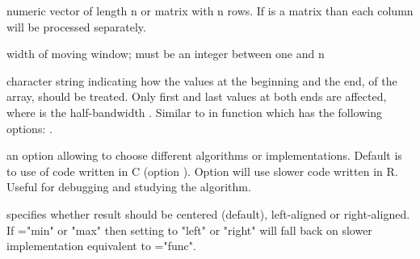 \begin{Arguments}
\begin{ldescription}
\item[\code{x}] numeric vector of length n or matrix with n rows. If  is a 
matrix than each column will be processed separately.
\item[\code{k}] width of moving window; must be an integer between one and n 
\item[\code{endrule}] character string indicating how the values at the beginning 
and the end, of the array, should be treated. Only first and last  
values at both ends are affected, where  is the half-bandwidth 
.
Similar to  in  function which has the 
following options:  .

\item[\code{alg}] an option allowing to choose different algorithms or 
implementations. Default is to use of code written in C (option ).
Option  will use slower code written in R. Useful for 
debugging and studying the algorithm.
\item[\code{align}] specifies whether result should be centered (default), 
left-aligned or right-aligned.  If ="min" or "max" then setting
 to "left" or "right" will fall back on slower implementation 
equivalent to ="func". 
\end{ldescription}
\end{Arguments}

